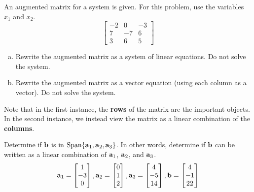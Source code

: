 \begin{exercise} %
	An augmented matrix for a system is given. For this problem, use the variables $x_1$ and $x_2$.
	$$\begin{bmatrix}
	-2 & 0 & -3 \\ 7 & -7 & 6 \\ 3 & 6 & 5
	\end{bmatrix}$$
	\begin{multicols}{2}
		\begin{enumerate}[(a)]
			\item Rewrite the augmented matrix as a system of linear equations. Do not solve the system.
			\item Rewrite the augmented matrix as a vector equation (using each column as a vector). Do not solve the system.
		\end{enumerate}
	\end{multicols}
	\vfill
	Note that in the first instance, the \textbf{rows} of the matrix are the important objects. In the second instance, we instead view the matrix as a linear combination of the \textbf{columns}.
\end{exercise}


\newpage


\begin{exercise} %
	Determine if $\boldsymbol{\mathbf{b}}$ is in $\operatorname{Span}\{\boldsymbol{\mathbf{a}}_1, \boldsymbol{\mathbf{a}}_2, \boldsymbol{\mathbf{a}}_3\}$. In other words, determine if $\boldsymbol{\mathbf{b}}$ can be written as a linear combination of $\boldsymbol{\mathbf{a}}_1$, $\boldsymbol{\mathbf{a}}_2$, and $\boldsymbol{\mathbf{a}}_3$.
	$$ \boldsymbol{\mathbf{a}}_1 = \begin{bmatrix} 1 \\ -3 \\ 0 \end{bmatrix}, 
	\boldsymbol{\mathbf{a}}_2 = \begin{bmatrix} 0 \\ 1 \\ 2 \end{bmatrix}, 
	\boldsymbol{\mathbf{a}}_3 = \begin{bmatrix} 4 \\ -5 \\ 14 \end{bmatrix},
	\boldsymbol{\mathbf{b}} = \begin{bmatrix} 4 \\ -1 \\ 22 \end{bmatrix}$$
\end{exercise}
\vfill


